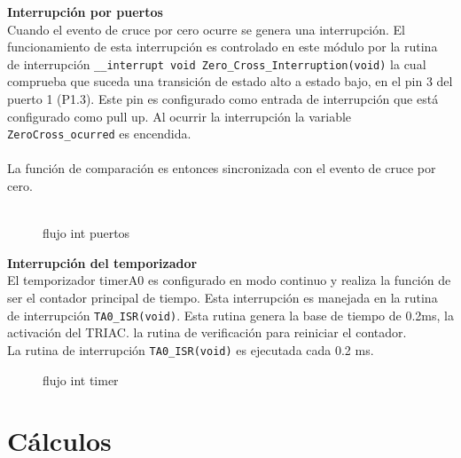 \documentclass{article}
\begin{document}
        \textbf{Interrupci\'on por puertos} \\
        Cuando el evento de cruce por cero ocurre se genera una interrupci\'on. El funcionamiento de esta interrupci\'on es controlado en este m\'odulo por la rutina de interrupci\'on \verb|__interrupt void Zero_Cross_Interruption(void)| la cual comprueba que suceda una transici\'on de estado alto a estado bajo, en el pin 3 del puerto 1 (P1.3). Este pin es configurado como entrada de interrupci\'on que est\'a configurado como pull up. Al ocurrir la interrupci\'on la variable \verb|ZeroCross_ocurred| es encendida.\\ \\

        La funci\'on de comparaci\'on es entonces sincronizada con el evento de cruce por cero. \\ \\

        \begin{figure}[ht]
            \centering
            \tcbox [ sharp corners, left=30mm,right=30mm, boxsep=5mm, boxrule=0.3mm, colback=white ]
                {       }
            \caption{flujo int puertos}
            \label{fig:my_label0}
        \end{figure}

        \textbf{Interrupci\'on del temporizador} \\
        El temporizador timerA0 es configurado en modo continuo y realiza la funci\'on de ser el contador principal de tiempo. Esta interrupci\'on es manejada en la rutina de interrupci\'on \verb|TA0_ISR(void)|. Esta rutina genera la base de tiempo de 0.2ms, la activaci\'on del TRIAC. la rutina de verificaci\'on para reiniciar el contador. \\

        La rutina de interrupci\'on \verb|TA0_ISR(void)| es ejecutada cada 0.2 ms.\\

        \begin{figure}[ht]
            \centering
            \tcbox[ sharp corners, left=10mm,right=0mm, boxsep=5mm, boxrule=0.3mm, colback=white ]
            {       }
            \caption{flujo int timer}
            \label{fig:my_label1}
        \end{figure}
    \newpage

    \section{Cálculos}
    

    
    
\end{document}
